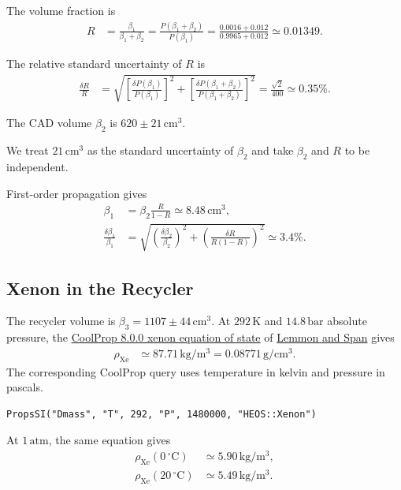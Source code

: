 \documentclass{article}
\begin{document}
The volume fraction is
\begin{align}
    R &= \frac{\beta_1}{\beta_1+\beta_2} = \frac{P(\beta_1+\beta_2)}{P(\beta_1)} = \frac{0.0016+0.012}{0.9965+0.012}\simeq 0.01349.
\end{align}

The relative standard uncertainty of $R$ is
\begin{align}
    \frac{\delta R}{R} &= \sqrt{ \left[\frac{\delta P(\beta_1)}{P(\beta_1)}\right]^2 + \left[\frac{\delta P(\beta_1+\beta_2)}{P(\beta_1+\beta_2)}\right]^2 } = \frac{\sqrt{2}}{400} \simeq 0.35\%.
\end{align}

The CAD volume $\beta_2$ is $620\pm21\,\mathrm{cm^3}$.

\begin{keyidea}
    We treat $21\,\mathrm{cm^3}$ as the standard uncertainty of $\beta_2$ and take $\beta_2$ and $R$ to be independent.
\end{keyidea}

First-order propagation gives
\begin{align}
    \beta_1 &= \beta_2\frac{R}{1-R}\simeq 8.48\,\mathrm{cm^3}, \\
    \frac{\delta\beta_1}{\beta_1} &= \sqrt{ \left(\frac{\delta\beta_2}{\beta_2}\right)^2 + \left(\frac{\delta R}{R(1-R)}\right)^2 } \simeq 3.4\%.
\end{align}

\subsection{Xenon in the Recycler}

The recycler volume is $\beta_3=1107\pm44\,\mathrm{cm^3}$. At $292\,\mathrm K$ and $14.8\,\mathrm{bar}$ absolute pressure, the \href{https://coolprop.org/fluid_properties/fluids/Xenon.html}{CoolProp 8.0.0 xenon equation of state} of \href{https://doi.org/10.1021/je050186n}{Lemmon and Span} gives
\begin{align}
    \rho_\mathrm{Xe} &\simeq 87.71\,\mathrm{kg/m^3} = 0.08771\,\mathrm{g/cm^3}.
\end{align}
The corresponding CoolProp query uses temperature in kelvin and pressure in pascals.
\begin{verbatim}
PropsSI("Dmass", "T", 292, "P", 1480000, "HEOS::Xenon")
\end{verbatim}
At $1\,\mathrm{atm}$, the same equation gives
\begin{align*}
    \rho_\mathrm{Xe}(0\,^\circ\mathrm C) &\simeq 5.90\,\mathrm{kg/m^3}, \\
    \rho_\mathrm{Xe}(20\,^\circ\mathrm C) &\simeq 5.49\,\mathrm{kg/m^3}.
\end{align*}
\end{document}
